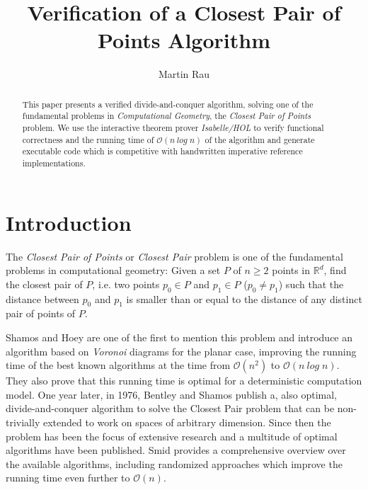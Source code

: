 \documentclass{llncs}
\begin{document}
\title{Verification of a Closest Pair of Points Algorithm}
\author{Martin Rau}
\date{}
\maketitle

\begin{abstract}
This paper presents a verified divide-and-conquer algorithm, solving one of the fundamental problems
in \textit{Computational Geometry}, the \textit{Closest Pair of Points} problem.
We use the interactive theorem prover \textit{Isabelle/HOL} to verify functional correctness
and the running time of $\mathcal{O}(n\ \mathit{log}\;n)$ of the algorithm and generate executable code 
which is competitive with handwritten imperative reference implementations.
\end{abstract}


\section{Introduction}

The \textit{Closest Pair of Points} or \textit{Closest Pair} problem is one of the fundamental
problems in computational geometry: Given a set $P$ of $n \geq 2$ points in $\mathbb{R}^d$,
find the closest pair of $P$, i.e. two points $p_0 \in P$ and $p_1 \in P$ ($p_0 \ne p_1$) such that 
the distance between $p_0$ and $p_1$ is smaller than or equal to the distance of any distinct pair 
of points of $P$.

Shamos and Hoey \cite{Closest-Point-Problems:1975} are one of the first to mention this problem and
introduce an algorithm based on \textit{Voronoi} diagrams for the planar case, improving the running 
time of the best known algorithms at the time from $\mathcal{O}(n^2)$ to
$\mathcal{O}(n\ \mathit{log}\;n)$. They also prove that this running time is optimal for a
deterministic computation model. One year later, in 1976, Bentley and Shamos
\cite{Divide-And-Conquer-In-Multidimensional-Space:1976} publish a, also optimal, divide-and-conquer
algorithm to solve the Closest Pair problem that can be non-trivially extended to work on
spaces of arbitrary dimension. Since then the problem has been the focus of extensive research and
a multitude of optimal algorithms have been published. Smid \cite{Handbook-Computational-Geometry:2000}
provides a comprehensive overview over the available algorithms, including randomized approaches which
improve the running time even further to $\mathcal{O}(n)$.
\end{document}
